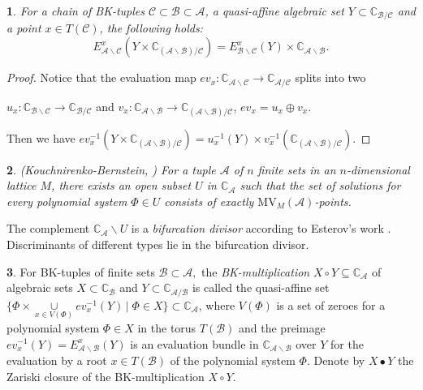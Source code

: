 \documentclass[11pt]{article}
\theoremstyle{plain}
\newtheorem{thm}{\protect\theoremname}[section]
\theoremstyle{definition}
\newtheorem{defn}[thm]{\protect\definitionname}
\theoremstyle{remark}
\theoremstyle{plain}
\newtheorem{lem}[thm]{\protect\lemmaname}
\theoremstyle{plain}
\theoremstyle{plain}
\theoremstyle{definition}
\providecommand{\definitionname}{Definition}
\providecommand{\lemmaname}{Lemma}
\providecommand{\theoremname}{Theorem}
\begin{document}
\begin{lem}
\label{Lemma. Fiber change}For a chain of BK-tuples $\mathscr{C}\subset\mathscr{B}\subset\mathscr{A}$,
a quasi-affine algebraic set $Y\subset\mathbb{C}_{\mathscr{B}/\mathscr{C}}$
and a point $x\in T(\mathscr{C})$, the following holds:
\[
E_{\mathscr{A}\backslash\mathscr{C}}^{x}\left(Y\times\mathbb{C}_{(\mathscr{A}\backslash\mathscr{B})/\mathscr{C}}\right)=E_{\mathscr{B}\backslash\mathscr{C}}^{x}(Y)\times\mathbb{C}_{\mathscr{A}\backslash\mathscr{B}}.
\]
\end{lem}

\begin{proof}
Notice that the evaluation map $ev_{x}:\mathbb{C}_{\mathscr{A}\backslash\mathscr{C}}\rightarrow\mathbb{C}_{\mathscr{A}/\mathscr{C}}$
splits into two 

$u_{x}:\mathbb{C}_{\mathscr{B}\backslash\mathscr{C}}\rightarrow\mathbb{C}_{\mathscr{B}/\mathscr{C}}$
and $v_{x}:\mathbb{C}_{\mathscr{A}\backslash\mathscr{B}}\rightarrow\mathbb{C}_{(\mathscr{A}\backslash\mathscr{B})/\mathscr{C}}$,
$ev_{x}=u_{x}\oplus v_{x}.$ 

Then we have $ev_{x}^{-1}(Y\times\mathbb{C}_{(\mathscr{A}\backslash\mathscr{B})/\mathscr{C}})=u_{x}^{-1}(Y)\times v_{x}^{-1}(\mathbb{C}_{(\mathscr{A}\backslash\mathscr{B})/\mathscr{C}}).$
\end{proof}
\begin{thm}
\textup{\label{Theorem. Reformulation of Kouchnirenko-Bernstein theorem}(Kouchnirenko-Bernstein,
\cite{bernshtein_number_1975})} For a tuple $\mathscr{A}$ of $n$
finite sets in an $n$-dimensional lattice $M$, there exists an open
subset $U$ in $\mathbb{C}_{\mathscr{A}}$ such that the set of solutions
for every polynomial system $\Phi\in U$ consists of exactly $\mathrm{MV}_{M}(\mathscr{A})$-points.
\end{thm}

The complement $\mathbb{C}_{\mathscr{A}}\backslash U$ is a \textit{bifurcation
divisor} according to Esterov's work \cite{esterov_discriminant_2013}.
Discriminants of different types lie in the bifurcation divisor.
\begin{defn}
\label{Definition. BK-multiplication}For BK-tuples of finite sets
$\mathscr{B}\subset\mathscr{A},$ the \textit{BK-multiplication} $X\circ Y\subseteq\mathbb{C}_{\mathscr{A}}$
of algebraic sets $X\subset\mathbb{C}_{\mathscr{B}}$ and $Y\subset\mathbb{C}_{\mathscr{A}/\mathscr{B}}$
is called the quasi-affine set $\{\Phi\times\underset{x\in V(\Phi)}{\cup}ev_{x}^{-1}(Y)\,|\;\Phi\in X\}\subset\mathbb{C}_{\mathscr{A}}$,
where $V(\Phi)$ is a set of zeroes for a polynomial system $\Phi\in X$
in the torus $T(\mathscr{B})$ and the preimage $ev_{x}^{-1}(Y)=E_{\mathscr{A}\backslash\mathscr{B}}^{x}(Y)$
is an evaluation bundle in $\mathbb{C}_{\mathscr{A}\backslash\mathscr{B}}$
over $Y$ for the evaluation by a root $x\in T(\mathscr{B})$ of the
polynomial system $\Phi$. Denote by $X\bullet Y$ the Zariski closure
of the BK-multiplication $X\circ Y.$
\end{defn}
\end{document}
